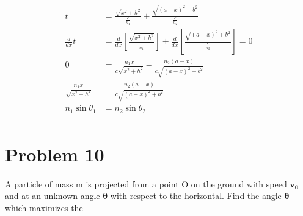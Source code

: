 \documentclass[]{article}
\begin{document}
{			\begin{equation*}
				\begin{split}
					t &= \frac{\sqrt{x^2 + h^2}}{\frac{c}{n_1}} + \frac{\sqrt{(a-x)^2 + b^2}}{\frac{c}{n_2}} \\
					\frac{d}{dx} t &= \frac{d}{dx} \left[ \frac{\sqrt{x^2 + h^2}}{\frac{c}{n_1}} \right] + \frac{d}{dx} \left[ \frac{\sqrt{(a-x)^2 + b^2}}{\frac{c}{n_2}} \right] = 0 \\
					0 &= \frac{n_1x}{c\sqrt{x^2 + h^2}} - \frac{n_2(a-x)}{c\sqrt{(a-x)^2 + b^2}} \\
					\frac{n_1x}{\sqrt{x^2 + h^2}} &= \frac{n_2(a-x)}{c\sqrt{(a-x)^2 + b^2}} \\
					n_1 \sin \theta_1 &= n_2 \sin \theta_2 \\
				\end{split}
			\end{equation*}
		
	\clearpage

	\section*{Problem 10}

		\paragraph{} A particle of mass m is projected from a point O on the ground with speed $\bm{v_0}$ and at an unknown angle $\bm{\theta}$ with respect to the
		horizontal. Find the angle $\bm{\theta}$ which maximizes the
}
\end{document}
